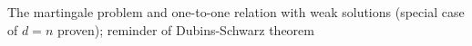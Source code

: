 The martingale problem and one-to-one relation with weak solutions (special case of $d=n$ proven); reminder of Dubins-Schwarz theorem